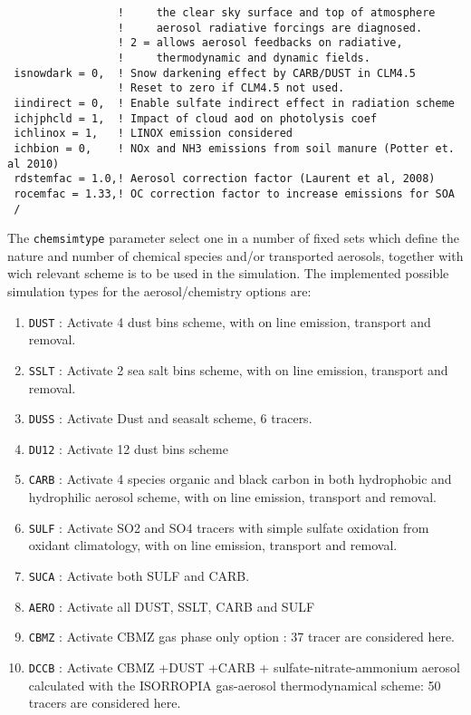 {\begin{Verbatim}
                 !     the clear sky surface and top of atmosphere 
                 !     aerosol radiative forcings are diagnosed.
                 ! 2 = allows aerosol feedbacks on radiative,
                 !     thermodynamic and dynamic fields.
 isnowdark = 0,  ! Snow darkening effect by CARB/DUST in CLM4.5
                 ! Reset to zero if CLM4.5 not used.
 iindirect = 0,  ! Enable sulfate indirect effect in radiation scheme
 ichjphcld = 1,  ! Impact of cloud aod on photolysis coef
 ichlinox = 1,   ! LINOX emission considered
 ichbion = 0,    ! NOx and NH3 emissions from soil manure (Potter et. al 2010)
 rdstemfac = 1.0,! Aerosol correction factor (Laurent et al, 2008)
 rocemfac = 1.33,! OC correction factor to increase emissions for SOA
 /
\end{Verbatim}
}

The \verb=chemsimtype= parameter select one in a number of fixed sets which
define the nature and number of chemical species and/or transported aerosols,
together with wich relevant scheme is to be used in the simulation.
The implemented possible simulation types for the aerosol/chemistry options
are:

\begin{enumerate}
  \item \verb=DUST= : Activate 4 dust bins scheme, with on line emission,
    transport and removal.
  \item \verb=SSLT= : Activate 2 sea salt bins scheme, with on line emission,
    transport and removal.
  \item \verb=DUSS= : Activate Dust and seasalt scheme, 6 tracers.
  \item \verb=DU12= : Activate 12 dust bins scheme
  \item \verb=CARB= : Activate 4 species organic and black carbon in both
    hydrophobic and hydrophilic aerosol scheme, with on line emission,
    transport and removal.
  \item \verb=SULF= : Activate SO2 and SO4 tracers with simple sulfate
    oxidation from oxidant climatology, with on line emission,
    transport and removal.
  \item \verb=SUCA= : Activate both SULF and CARB.
  \item \verb=AERO= : Activate all DUST, SSLT, CARB and SULF
  \item \verb=CBMZ= : Activate CBMZ gas phase only option : 37 tracer are
    considered here.
  \item \verb=DCCB= : Activate CBMZ +DUST +CARB 
         + sulfate-nitrate-ammonium aerosol calculated with the ISORROPIA 
         gas-aerosol thermodynamical scheme: 50 tracers are considered here.
\end{enumerate}

